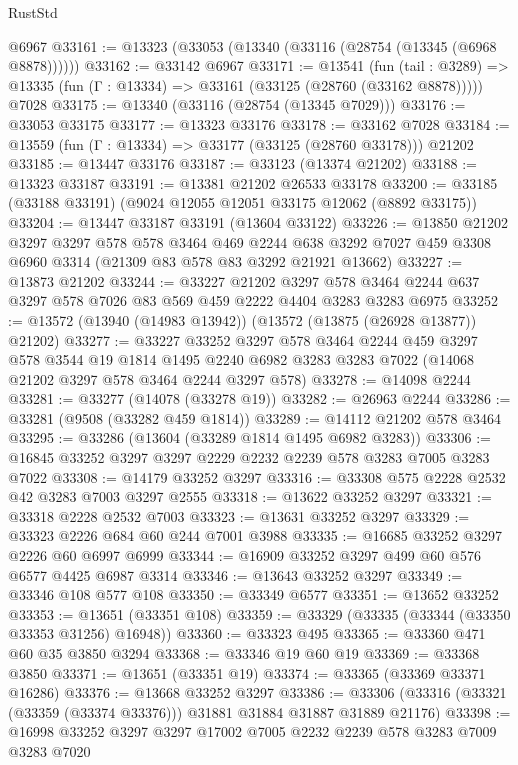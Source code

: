 \begin{lexlean}{RustStd}
\begin{coremodule}
    @6967
@33161 := @13323 (@33053 (@13340 (@33116 (@28754 (@13345 (@6968 @8878))))))
@33162 := @33142 @6967
@33171 := @13541
    (fun (tail : @3289) => @13335 (fun (Γ : @13334) => @33161 (@33125 (@28760 (@33162 @8878)))))
    @7028
@33175 := @13340 (@33116 (@28754 (@13345 @7029)))
@33176 := @33053 @33175
@33177 := @13323 @33176
@33178 := @33162 @7028
@33184 := @13559 (fun (Γ : @13334) => @33177 (@33125 (@28760 @33178))) @21202
@33185 := @13447 @33176
@33187 := @33123 (@13374 @21202)
@33188 := @13323 @33187
@33191 := @13381 @21202 @26533 @33178
@33200 := @33185 (@33188 @33191) (@9024 @12055 @12051 @33175 @12062 (@8892 @33175))
@33204 := @13447 @33187 @33191 (@13604 @33122)
@33226 := @13850
    @21202
    @3297
    @3297
    @578
    @578
    @3464
    @469
    @2244
    @638
    @3292
    @7027
    @459
    @3308
    @6960
    @3314
    (@21309 @83 @578 @83 @3292 @21921 @13662)
@33227 := @13873 @21202
@33244 := @33227
    @21202
    @3297
    @578
    @3464
    @2244
    @637
    @3297
    @578
    @7026
    @83
    @569
    @459
    @2222
    @4404
    @3283
    @3283
    @6975
@33252 := @13572 (@13940 (@14983 @13942)) (@13572 (@13875 (@26928 @13877)) @21202)
@33277 := @33227
    @33252
    @3297
    @578
    @3464
    @2244
    @459
    @3297
    @578
    @3544
    @19
    @1814
    @1495
    @2240
    @6982
    @3283
    @3283
    @7022
    (@14068 @21202 @3297 @578 @3464 @2244 @3297 @578)
@33278 := @14098 @2244
@33281 := @33277 (@14078 (@33278 @19))
@33282 := @26963 @2244
@33286 := @33281 (@9508 (@33282 @459 @1814))
@33289 := @14112 @21202 @578 @3464
@33295 := @33286 (@13604 (@33289 @1814 @1495 @6982 @3283))
@33306 := @16845 @33252 @3297 @3297 @2229 @2232 @2239 @578 @3283 @7005 @3283 @7022
@33308 := @14179 @33252 @3297
@33316 := @33308 @575 @2228 @2532 @42 @3283 @7003 @3297 @2555
@33318 := @13622 @33252 @3297
@33321 := @33318 @2228 @2532 @7003
@33323 := @13631 @33252 @3297
@33329 := @33323 @2226 @684 @60 @244 @7001 @3988
@33335 := @16685 @33252 @3297 @2226 @60 @6997 @6999
@33344 := @16909 @33252 @3297 @499 @60 @576 @6577 @4425 @6987 @3314
@33346 := @13643 @33252 @3297
@33349 := @33346 @108 @577 @108
@33350 := @33349 @6577
@33351 := @13652 @33252
@33353 := @13651 (@33351 @108)
@33359 := @33329 (@33335 (@33344 (@33350 @33353 @31256) @16948))
@33360 := @33323 @495
@33365 := @33360 @471 @60 @35 @3850 @3294
@33368 := @33346 @19 @60 @19
@33369 := @33368 @3850
@33371 := @13651 (@33351 @19)
@33374 := @33365 (@33369 @33371 @16286)
@33376 := @13668 @33252 @3297
@33386 := @33306 (@33316 (@33321 (@33359 (@33374 @33376))) @31881 @31884 @31887 @31889 @21176)
@33398 := @16998 @33252 @3297 @3297 @17002 @7005 @2232 @2239 @578 @3283 @7009 @3283 @7020

\end{coremodule}
\end{lexlean}
